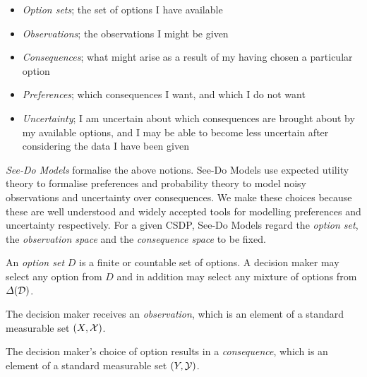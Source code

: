 





\begin{itemize}
    \item \emph{Option sets}; the set of options I have available
    \item \emph{Observations}; the observations I might be given
    \item \emph{Consequences}; what might arise as a result of my having chosen a particular option
    \item \emph{Preferences}; which consequences I want, and which I do not want
    \item \emph{Uncertainty}; I am uncertain about which consequences are brought about by my available options, and I may be able to become less uncertain after considering the data I have been given
\end{itemize}

\emph{See-Do Models} formalise the above notions. See-Do Models use expected utility theory to formalise preferences and probability theory to model noisy observations and uncertainty over consequences. We make these choices because these are well understood and widely accepted tools for modelling preferences and uncertainty respectively. For a given CSDP, See-Do Models regard the \emph{option set}, the \emph{observation space} and the \emph{consequence space} to be fixed.

\begin{definition}
An \emph{option set} $D$ is a finite or countable set of options. A decision maker may select any option from $D$ and in addition may select any mixture of options from $\Delta(\mathcal{D})$.
\end{definition}

\begin{definition}
The decision maker receives an \emph{observation}, which is an element of a standard measurable set $(X,\mathcal{X})$.
\end{definition}

\begin{definition}
The decision maker's choice of option results in a \emph{consequence}, which is an element of a standard measurable set $(Y,\mathcal{Y})$.
\end{definition}

